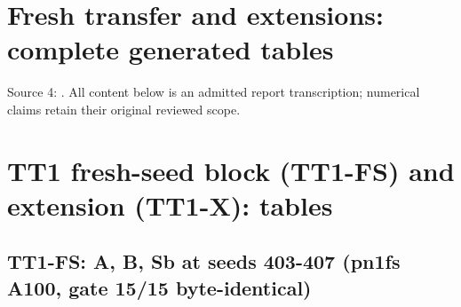 \documentclass[10pt,twocolumn,letterpaper]{article}
\begin{document}
\section{Fresh transfer and extensions: complete generated tables}
\noindent Source 4: \protect{}. All content below is an admitted report transcription; numerical claims retain their original reviewed scope.

\section{TT1 fresh-seed block (TT1-FS) and extension (TT1-X): tables}\label{tt1-fresh-seed-block-tt1-fs-and-extension-tt1-x-tables}

\subsection{TT1-FS: A, B, Sb at seeds 403-407 (pn1fs A100, gate 15/15 byte-identical)}\label{tt1-fs-a-b-sb-at-seeds-403-407-pn1fs-a100-gate-1515-byte-identical}
\end{document}
